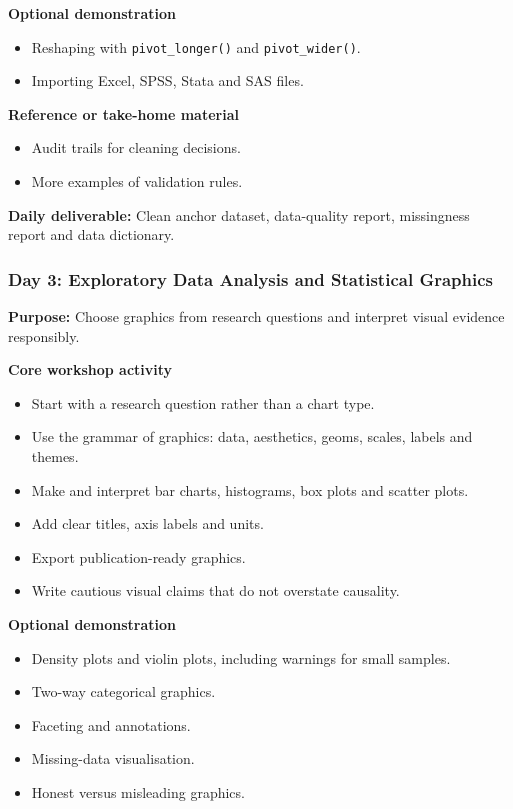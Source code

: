 \documentclass[11pt]{article}
\providecommand{\tightlist}{%
  \setlength{\itemsep}{0pt}\setlength{\parskip}{0pt}}
\begin{document}
\textbf{Optional demonstration}

\begin{itemize}
\tightlist
\item
  Reshaping with \texttt{pivot\_longer()} and \texttt{pivot\_wider()}.
\item
  Importing Excel, SPSS, Stata and SAS files.
\end{itemize}

\textbf{Reference or take-home material}

\begin{itemize}
\tightlist
\item
  Audit trails for cleaning decisions.
\item
  More examples of validation rules.
\end{itemize}

\textbf{Daily deliverable:} Clean anchor dataset, data-quality report,
missingness report and data dictionary.

\hypertarget{day-3-exploratory-data-analysis-and-statistical-graphics}{%
\subsubsection{Day 3: Exploratory Data Analysis and Statistical
Graphics}\label{day-3-exploratory-data-analysis-and-statistical-graphics}}

\textbf{Purpose:} Choose graphics from research questions and interpret
visual evidence responsibly.

\textbf{Core workshop activity}

\begin{itemize}
\tightlist
\item
  Start with a research question rather than a chart type.
\item
  Use the grammar of graphics: data, aesthetics, geoms, scales, labels
  and themes.
\item
  Make and interpret bar charts, histograms, box plots and scatter
  plots.
\item
  Add clear titles, axis labels and units.
\item
  Export publication-ready graphics.
\item
  Write cautious visual claims that do not overstate causality.
\end{itemize}

\textbf{Optional demonstration}

\begin{itemize}
\tightlist
\item
  Density plots and violin plots, including warnings for small samples.
\item
  Two-way categorical graphics.
\item
  Faceting and annotations.
\item
  Missing-data visualisation.
\item
  Honest versus misleading graphics.
\end{itemize}
\end{document}
